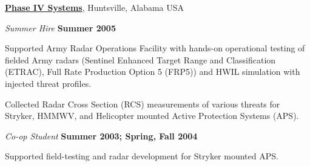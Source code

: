 \documentclass[8pt]{article}
\renewcommand{\section}[2]%
        {\pagebreak[2]\vspace{1.\baselineskip}%
         \phantomsection\addcontentsline{toc}{section}{#1}%
         \hspace{0in}%
         \marginpar{
         \raggedright \scshape #1}#2}
\newenvironment{outerlist}[1][\enskip\textbullet]%
       {\begin{compactenum}[#1]}{\end{compactenum}%
        \vspace{-.3\baselineskip}}
\newenvironment{innerlist}[1][\enskip\textbullet]%
        {\begin{compactenum}[#1]}{\end{compactenum}}
\begin{document}
%
\href{http://www.phaseiv.com/}{\textbf{Phase IV Systems}},
Huntsville, Alabama USA
\begin{outerlist}
\item[] \textit{Summer Hire}%
        \hfill \textbf{Summer 2005}
\begin{innerlist}
\item Supported Army Radar Operations Facility with hands-on operational testing of fielded
      Army radars (Sentinel Enhanced Target Range and Classification (ETRAC), Full Rate Production
      Option 5 (FRP5)) and HWIL simulation with injected threat profiles.

\item Collected Radar Cross Section (RCS) measurements of various threats for Stryker, HMMWV,
      and Helicopter mounted Active Protection Systems (APS).
\end{innerlist}
\item[] \textit{Co-op Student}%
        \hfill \textbf{Summer 2003; Spring, Fall 2004}
\begin{innerlist}
\item Supported field-testing and radar development for Stryker mounted APS.
\end{innerlist}
\end{outerlist}


\end{document}
